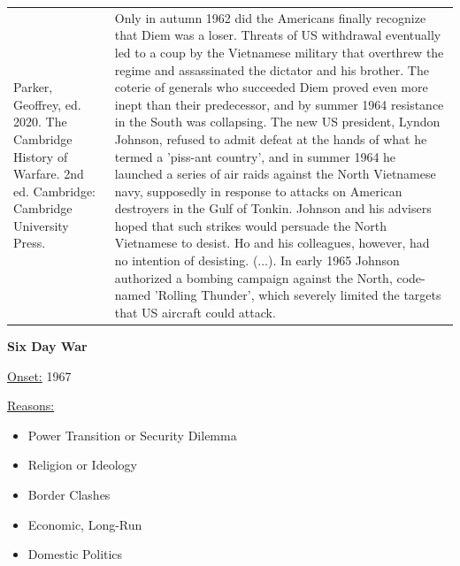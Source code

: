 {\begin{longtable}{p{}p{}}
Parker, Geoffrey, ed. 2020. The Cambridge History of Warfare. 2nd ed. Cambridge: Cambridge University Press. & Only in autumn 1962 did the Americans finally recognize that Diem was a loser. Threats of US withdrawal eventually led to a coup by the Vietnamese military that overthrew the regime and assassinated the dictator and his brother. The coterie of generals who succeeded Diem proved even more inept than their predecessor, and by summer 1964 resistance in the South was collapsing. The new US president, Lyndon Johnson, refused to admit defeat at the hands of what he termed a 'piss-ant country', and in summer 1964 he launched a series of air raids against the North Vietnamese navy, supposedly in response to attacks on American destroyers in the Gulf of Tonkin. Johnson and his advisers hoped that such strikes would persuade the North Vietnamese to desist. Ho and his colleagues, however, had no intention of desisting. (...). In early 1965 Johnson authorized a bombing campaign against the North, code-named 'Rolling Thunder', which severely limited the targets that US aircraft could attack.  
\\
\end{longtable}}
\clearpage
         \textbf{Six Day War} 

          \underline{Onset:} 1967         

\underline{Reasons:}
\begin{itemize}
\item Power Transition or Security Dilemma
\item Religion or Ideology
\item Border Clashes
\item Economic, Long-Run
\item Domestic Politics
\end{itemize}

